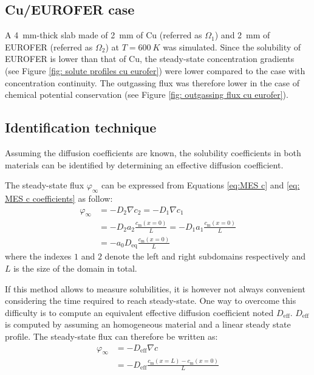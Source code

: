 \subsection{Cu/EUROFER case}

A \SI{4}{mm}-thick slab made of \SI{2}{mm} of Cu (referred as $\Omega_1$) and \SI{2}{mm} of EUROFER (referred as $\Omega_2$) at $T=\SI{600}{K}$ was simulated.
Since the solubility of EUROFER is lower than that of Cu, the steady-state concentration gradients (see Figure \ref{fig: solute profiles cu eurofer}) were lower compared to the case with concentration continuity.
The outgassing flux was therefore lower in the case of chemical potential conservation (see Figure \ref{fig: outgassing flux cu eurofer}).


\subsection{Identification technique}
Assuming the diffusion coefficients are known, the solubility coefficients in both materials can be identified by determining an effective diffusion coefficient.

The steady-state flux $\varphi_\infty$ can be expressed from Equations \ref{eq:MES c} and \ref{eq: MES c coefficients} as follow:
\begin{subequations}
    \begin{align}
        \varphi_\infty &= -D_2 \nabla c_2 =  -D_1 \nabla c_1 \\
        &= -D_2 a_2 \frac{c_\mathrm{m}(x=0)}{L} = -D_1 a_1 \frac{c_\mathrm{m}(x=0)}{L}\\
        &= -a_0 D_\mathrm{eq} \frac{c_\mathrm{m}(x=0)}{L}
    \end{align}
    \label{eq: steady state flux 1}
\end{subequations}
where the indexes $1$ and $2$ denote the left and right subdomains respectively and $L$ is the size of the domain in total.

If this method allows to measure solubilities, it is however not always convenient considering the time required to reach steady-state.
One way to overcome this difficulty is to compute an equivalent effective diffusion coefficient noted $D_\mathrm{eff}$.
$D_\mathrm{eff}$ is computed by assuming an homogeneous material and a linear steady state profile.
The steady-state flux can therefore be written as:
\begin{subequations}
    \begin{align}
        \varphi_\infty &= -D_\mathrm{eff} \nabla c \\
        &= -D_\mathrm{eff} \frac{c_\mathrm{m}(x=L) - c_\mathrm{m}(x=0)}{L} \\
    \end{align}
    \label{eq: steady state flux 2}
\end{subequations}

